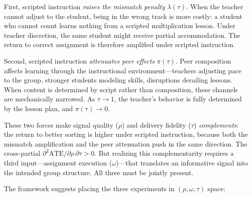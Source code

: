 \documentclass[11pt]{article}
\begin{document}
First, scripted instruction \emph{raises the mismatch penalty} $\lambda(\tau)$. When the teacher cannot adjust to the student, being in the wrong track is more costly: a student who cannot count learns nothing from a scripted multiplication lesson. Under teacher discretion, the same student might receive partial accommodation. The return to correct assignment is therefore amplified under scripted instruction.

Second, scripted instruction \emph{attenuates peer effects} $\pi(\tau)$. Peer composition affects learning through the instructional environment---teachers adjusting pace to the group, stronger students modeling skills, disruptions derailing lessons. When content is determined by script rather than composition, these channels are mechanically narrowed. As $\tau \to 1$, the teacher's behavior is fully determined by the lesson plan, and $\pi(\tau) \to 0$.

These two forces make signal quality ($\rho$) and delivery fidelity ($\tau$) \emph{complements}: the return to better sorting is higher under scripted instruction, because both the mismatch amplification and the peer attenuation push in the same direction. The cross-partial $\partial^2 \text{ATE}/\partial\rho\,\partial\tau > 0$. But realizing this complementarity requires a third input---assignment execution ($\omega$)---that translates an informative signal into the intended group structure. All three must be jointly present.

The framework suggests placing the three experiments in $(\rho, \omega, \tau)$ space:
\end{document}
